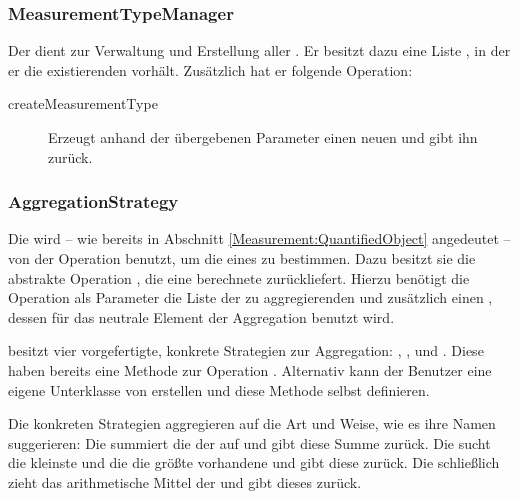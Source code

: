 \subsubsection{MeasurementTypeManager}
Der  dient zur Verwaltung und Erstellung aller . Er besitzt dazu eine Liste ,
in der er die existierenden  vorhält. Zusätzlich hat er folgende Operation:

\begin{description}
	\item[createMeasurementType] Erzeugt anhand der übergebenen Parameter einen neuen  und gibt ihn zurück.
\end{description}


\subsubsection{AggregationStrategy}
Die  wird -- wie bereits in Abschnitt \ref{Measurement:QuantifiedObject} angedeutet -- von der Operation  benutzt,
um die  eines  zu bestimmen. Dazu besitzt sie die abstrakte Operation , die eine 
berechnete  zurückliefert. Hierzu benötigt die Operation als Parameter die Liste der zu aggregierenden  und
zusätzlich einen , dessen  für das neutrale Element der Aggregation benutzt wird. 

 besitzt vier vorgefertigte, konkrete Strategien zur Aggregation:
, ,  und
. Diese haben bereits eine Methode zur Operation . Alternativ
kann der Benutzer eine eigene Unterklasse von  erstellen und diese Methode selbst definieren.

Die konkreten Strategien aggregieren auf die Art und Weise, wie es ihre Namen suggerieren: Die
 summiert die  der  auf und gibt diese Summe zurück. Die
 sucht die kleinste und die  die größte vorhandene
 und gibt diese zurück. Die  schließlich zieht das arithmetische Mittel der
 und gibt dieses zurück.

